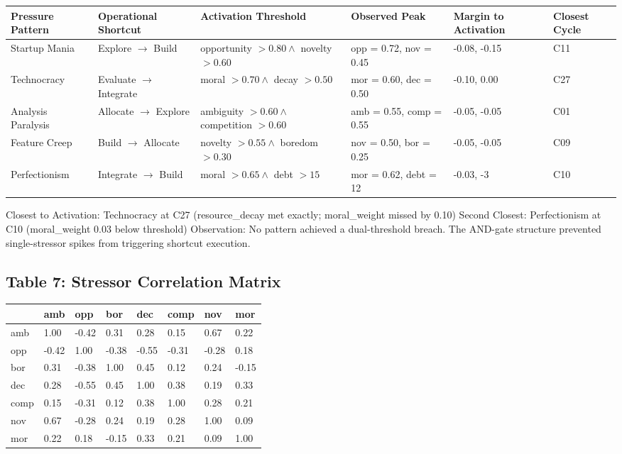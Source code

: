\documentclass[11pt,a4paper]{article}
\begin{document}
\begin{center}
\small
\begin{tabular}{llllll}
\toprule
\textbf{Pressure Pattern} & \textbf{Operational Shortcut} & \textbf{Activation Threshold} & \textbf{Observed Peak} & \textbf{Margin to Activation} & \textbf{Closest Cycle} \\
\midrule
Startup Mania & Explore $\to$ Build & opportunity $> 0.80 \land$ novelty $> 0.60$ & opp = 0.72, nov = 0.45 & -0.08, -0.15 & C11 \\
Technocracy & Evaluate $\to$ Integrate & moral $> 0.70 \land$ decay $> 0.50$ & mor = 0.60, dec = 0.50 & -0.10, 0.00 & C27 \\
Analysis Paralysis & Allocate $\to$ Explore & ambiguity $> 0.60 \land$ competition $> 0.60$ & amb = 0.55, comp = 0.55 & -0.05, -0.05 & C01 \\
Feature Creep & Build $\to$ Allocate & novelty $> 0.55 \land$ boredom $> 0.30$ & nov = 0.50, bor = 0.25 & -0.05, -0.05 & C09 \\
Perfectionism & Integrate $\to$ Build & moral $> 0.65 \land$ debt $> 15$ & mor = 0.62, debt = 12 & -0.03, -3 & C10 \\
\bottomrule
\end{tabular}
\end{center}

Closest to Activation: Technocracy at C27 (resource\_decay met exactly; moral\_weight missed by 0.10) Second Closest: Perfectionism at C10 (moral\_weight 0.03 below threshold) Observation: No pattern achieved a dual-threshold breach. The AND-gate structure prevented single-stressor spikes from triggering shortcut execution.

\subsection*{Table 7: Stressor Correlation Matrix}

\begin{center}
\begin{tabular}{llllllll}
\toprule
 & \textbf{amb} & \textbf{opp} & \textbf{bor} & \textbf{dec} & \textbf{comp} & \textbf{nov} & \textbf{mor} \\
\midrule
amb & 1.00 & -0.42 & 0.31 & 0.28 & 0.15 & 0.67 & 0.22 \\
opp & -0.42 & 1.00 & -0.38 & -0.55 & -0.31 & -0.28 & 0.18 \\
bor & 0.31 & -0.38 & 1.00 & 0.45 & 0.12 & 0.24 & -0.15 \\
dec & 0.28 & -0.55 & 0.45 & 1.00 & 0.38 & 0.19 & 0.33 \\
comp & 0.15 & -0.31 & 0.12 & 0.38 & 1.00 & 0.28 & 0.21 \\
nov & 0.67 & -0.28 & 0.24 & 0.19 & 0.28 & 1.00 & 0.09 \\
mor & 0.22 & 0.18 & -0.15 & 0.33 & 0.21 & 0.09 & 1.00 \\
\bottomrule
\end{tabular}
\end{center}
\end{document}
